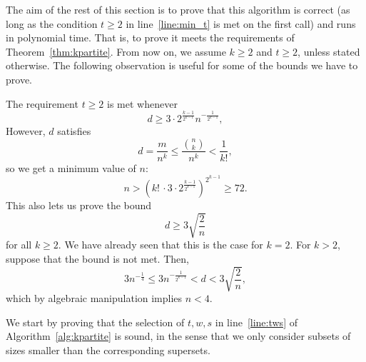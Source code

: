 The aim of the rest of this section is to prove that this algorithm is correct
(as long as the  condition $t \geq 2$ in line~\ref{line:min_t} is met on the first call)
and runs in polynomial time.
That is, to prove it meets the requirements of Theorem~\ref{thm:kpartite}.
From now on, we assume $k \geq 2$ and
$t \geq 2$, unless stated otherwise.
The following observation is useful for some of the bounds we have to prove.

\begin{remark}\label{rm:min_d}
    The requirement $t \geq 2$ is met whenever
    \[
        d \geq 3 \cdot 2^{\frac{k - 1}{2^{k-1}}} n^{-\frac{1}{2^{k-1}}},
    \]
    However, $d$ satisfies
    \[
        d = \frac{m}{n^k} \leq \frac{\binom{n}{k}}{n^k} < \frac{1}{k!},
    \]
    so we get a minimum value of $n$:
    \[
        n > \left( k!\, \cdot 3 \cdot 2^{\frac{k-1}{2^{k-1}}} \right)^{2^{k-1}} \geq 72.
    \]
    This also lets us prove the bound
    \[
        d \geq 3 \sqrt{\frac{2}{n}}
    \]
    for all $k \geq 2$.
    We have already seen that this is the case for $k=2$.
    For $k > 2$, suppose that the bound is not met.
    Then,
    \[
       3 n^{-\frac{1}{4}} \leq 3 n^{-\frac{1}{2^{k-1}}} < d < 3 \sqrt{\frac{2}{n}},
    \]
    which by algebraic manipulation implies $n < 4$.
\end{remark}

We start by proving that the selection of $t, w, s$ in line~\ref{line:tws} of Algorithm~\ref{alg:kpartite}
is sound, in the sense that we only consider subsets of sizes smaller than the corresponding supersets.

